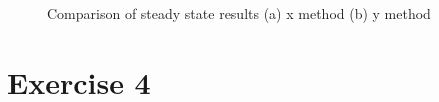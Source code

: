 \documentclass[a4paper,norsk, 10pt]{article}
\begin{document}
\begin{figure}
     \centering
     \caption{Comparison of steady state results (a) x method (b) y method}
     \label{steady_state}
\end{figure}


\section{Exercise 4}
\end{document}
